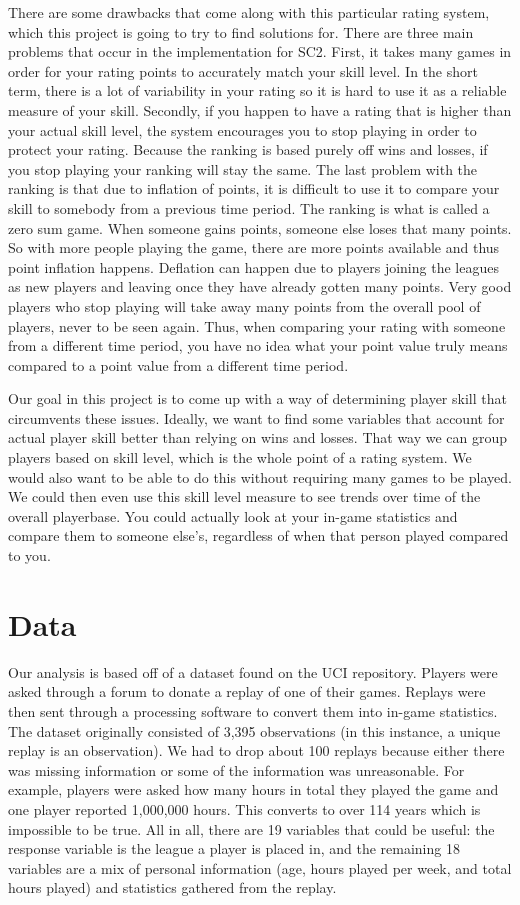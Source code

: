 \documentclass[letterpaper,10pt,english]{/usr/share/sphinx/texinputs/sphinxhowto}
\begin{document}
There are some drawbacks that come along with this particular rating
system, which this project is going to try to find solutions for. There
are three main problems that occur in the implementation for SC2. First,
it takes many games in order for your rating points to accurately match
your skill level. In the short term, there is a lot of variability in
your rating so it is hard to use it as a reliable measure of your skill.
Secondly, if you happen to have a rating that is higher than your actual
skill level, the system encourages you to stop playing in order to
protect your rating. Because the ranking is based purely off wins and
losses, if you stop playing your ranking will stay the same. The last
problem with the ranking is that due to inflation of points, it is
difficult to use it to compare your skill to somebody from a previous
time period. The ranking is what is called a zero sum game. When someone
gains points, someone else loses that many points. So with more people
playing the game, there are more points available and thus point
inflation happens. Deflation can happen due to players joining the
leagues as new players and leaving once they have already gotten many
points. Very good players who stop playing will take away many points
from the overall pool of players, never to be seen again. Thus, when
comparing your rating with someone from a different time period, you
have no idea what your point value truly means compared to a point value
from a different time period.

Our goal in this project is to come up with a way of determining player
skill that circumvents these issues. Ideally, we want to find some
variables that account for actual player skill better than relying on
wins and losses. That way we can group players based on skill level,
which is the whole point of a rating system. We would also want to be
able to do this without requiring many games to be played. We could then
even use this skill level measure to see trends over time of the overall
playerbase. You could actually look at your in-game statistics and
compare them to someone else's, regardless of when that person played
compared to you.\part{Data}Our analysis is based off of a dataset found on the UCI repository.
Players were asked through a forum to donate a replay of one of their
games. Replays were then sent through a processing software to convert
them into in-game statistics. The dataset originally consisted of 3,395
observations (in this instance, a unique replay is an observation). We
had to drop about 100 replays because either there was missing
information or some of the information was unreasonable. For example,
players were asked how many hours in total they played the game and one
player reported 1,000,000 hours. This converts to over 114 years which
is impossible to be true. All in all, there are 19 variables that could
be useful: the response variable is the league a player is placed in,
and the remaining 18 variables are a mix of personal information (age,
hours played per week, and total hours played) and statistics gathered
from the replay.
\end{document}
